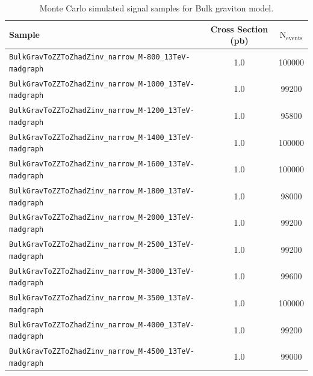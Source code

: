 \begin{table}[!ht]
\footnotesize
\begin{center}
\caption{Monte Carlo simulated signal samples for Bulk graviton model.}
\label{tab:signalsamples}
\begin{tabular}{lcc} \hline
Sample & Cross Section (pb) & $\text{N}_{\text{events}}$ \\ \hline
\verb|BulkGravToZZToZhadZinv_narrow_M-800_13TeV-madgraph| & 1.0 & 100000 \\
\verb|BulkGravToZZToZhadZinv_narrow_M-1000_13TeV-madgraph| & 1.0 & 99200 \\
\verb|BulkGravToZZToZhadZinv_narrow_M-1200_13TeV-madgraph| & 1.0 & 95800 \\
\verb|BulkGravToZZToZhadZinv_narrow_M-1400_13TeV-madgraph| & 1.0 & 100000 \\
\verb|BulkGravToZZToZhadZinv_narrow_M-1600_13TeV-madgraph| & 1.0 & 100000 \\
\verb|BulkGravToZZToZhadZinv_narrow_M-1800_13TeV-madgraph| & 1.0 & 98000 \\
\verb|BulkGravToZZToZhadZinv_narrow_M-2000_13TeV-madgraph| & 1.0 & 99200 \\
\verb|BulkGravToZZToZhadZinv_narrow_M-2500_13TeV-madgraph| & 1.0 & 99200 \\
\verb|BulkGravToZZToZhadZinv_narrow_M-3000_13TeV-madgraph| & 1.0 & 99600 \\
\verb|BulkGravToZZToZhadZinv_narrow_M-3500_13TeV-madgraph| & 1.0 & 100000 \\
\verb|BulkGravToZZToZhadZinv_narrow_M-4000_13TeV-madgraph| & 1.0 & 99200 \\
\verb|BulkGravToZZToZhadZinv_narrow_M-4500_13TeV-madgraph| & 1.0 & 99000 \\ \hline
\end{tabular}
\end{center}
\end{table}


